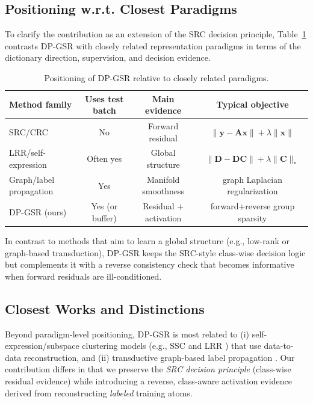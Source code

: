 \documentclass[10pt,comsoc]{IEEEtran}
\begin{document}
\subsection{Positioning w.r.t. Closest Paradigms}
To clarify the contribution as an extension of the SRC decision principle, Table~\ref{tab:positioning} contrasts DP-GSR with closely related representation paradigms in terms of the dictionary direction, supervision, and decision evidence.

\begin{table}[t]
\centering
\caption{Positioning of DP-GSR relative to closely related paradigms.}
\label{tab:positioning}
\begin{tabular}{l|c|c|c}
\hline
Method family & Uses test batch & Main evidence & Typical objective \\ \hline
SRC/CRC & No & Forward residual & $\|\mathbf{y}-\mathbf{A}\mathbf{x}\| + \lambda\|\mathbf{x}\|$ \\
LRR/self-expression & Often yes & Global structure & $\|\mathbf{D}-\mathbf{D}\mathbf{C}\| + \lambda\|\mathbf{C}\|_*$ \\
Graph/label propagation & Yes & Manifold smoothness & graph Laplacian regularization \\
DP-GSR (ours) & Yes (or buffer) & Residual + activation & forward+reverse group sparsity \\
\hline
\end{tabular}
\end{table}

In contrast to methods that aim to learn a global structure (e.g., low-rank or graph-based transduction), DP-GSR keeps the SRC-style class-wise decision logic but complements it with a reverse consistency check that becomes informative when forward residuals are ill-conditioned.

\subsection{Closest Works and Distinctions}
Beyond paradigm-level positioning, DP-GSR is most related to (i) self-expression/subspace clustering models (e.g., SSC \cite{elhamifar2013ssc} and LRR \cite{liu2013low}) that use data-to-data reconstruction, and (ii) transductive graph-based label propagation \cite{zhu2003semi, zhou2004learning}. Our contribution differs in that we preserve the \emph{SRC decision principle} (class-wise residual evidence) while introducing a reverse, class-aware activation evidence derived from reconstructing \emph{labeled} training atoms.
\end{document}
